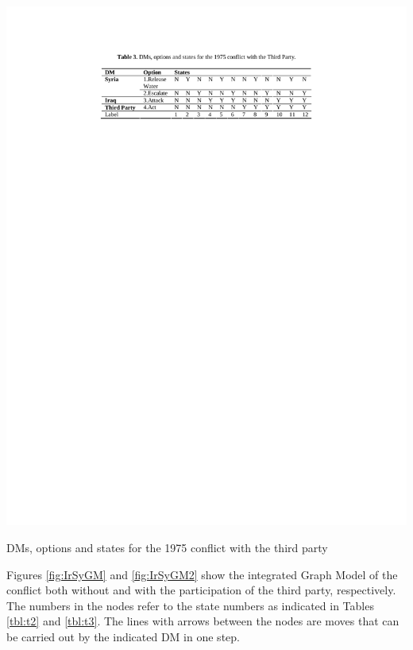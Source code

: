 \documentclass[letterpaper,12pt,titlepage,oneside,final]{book}
\begin{document}
\begin{table}[H]
\centering
\includegraphics[scale=1]{PDF-IMG/tables/3.pdf}

\caption{DMs, options and states for the 1975 conflict with the third party}

\label{tbl:t3}
\end{table}

Figures \ref{fig:IrSyGM} and \ref{fig:IrSyGM2} show the integrated Graph Model of the conflict both without and with the participation of the third party, respectively. The numbers in the nodes refer to the state numbers as indicated in Tables \ref{tbl:t2} and \ref{tbl:t3}. The lines with arrows between the nodes are moves that can be carried out by the indicated DM in one step. 
\end{document}
